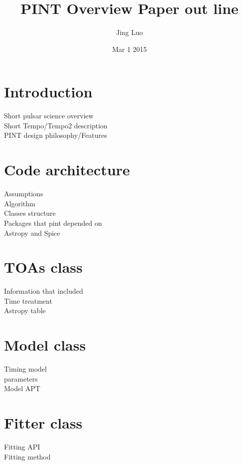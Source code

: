 \documentclass[11pt, oneside]{article}   	%
\title{PINT Overview Paper out line}
\author{Jing Luo}
\date{Mar 1 2015}							%
\begin{document}
\maketitle
\section{Introduction}
\indent Short pulsar science overview\\
Short Tempo/Tempo2 description\\
PINT design philosophy/Features\\
\section{Code architecture}
 \indent Assumptions\\
Algorithm\\ 
Classes structure\\
Packages that pint depended on\\
Astropy and Spice\\
\section{TOAs class}
\indent Information that included\\
Time treatment\\
 Astropy table\\
\section{Model class}
\indent Timing model\\ 
 parameters\\
 Model APT\\
\section{Fitter class}
 \indent Fitting API\\
  Fitting method\\
\end{document}
